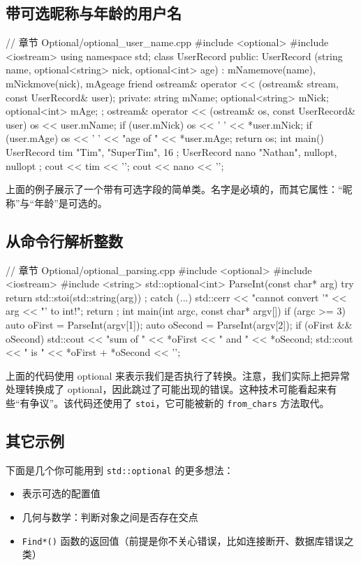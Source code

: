 \subsection{带可选昵称与年龄的用户名}
\begin{codebox}[cpp]
// 章节 Optional/optional_user_name.cpp
#include <optional>
#include <iostream>
using namespace std;
class UserRecord
{
public:
UserRecord (string name, optional<string> nick, optional<int> age)
: mName{move(name)}, mNick{move(nick)}, mAge{age}
{
}
friend ostream& operator << (ostream& stream, const UserRecord& user);
private:
string mName;
optional<string> mNick;
optional<int> mAge;
};
ostream& operator << (ostream& os, const UserRecord& user)
{
os << user.mName;
if (user.mNick)
os << ' ' << *user.mNick;
if (user.mAge)
os << ' ' << "age of " << *user.mAge;
return os;
}
int main()
{
UserRecord tim { "Tim", "SuperTim", 16 };
UserRecord nano { "Nathan", nullopt, nullopt };
cout << tim << '\n';
cout << nano << '\n';
}
\end{codebox}

上面的例子展示了一个带有可选字段的简单类。名字是必填的，而其它属性：“昵称”与“年龄”是可选的。

\subsection{从命令行解析整数}
\begin{codebox}[cpp]
// 章节 Optional/optional_parsing.cpp
#include <optional>
#include <iostream>
#include <string>
std::optional<int> ParseInt(const char* arg)
{
try
{
return { std::stoi(std::string(arg)) };
}
catch (...)
{
std::cerr << "cannot convert '" << arg << "' to int!\n";
}
return { };
}
int main(int argc, const char* argv[])
{
if (argc >= 3)
{
auto oFirst = ParseInt(argv[1]);
auto oSecond = ParseInt(argv[2]);
if (oFirst && oSecond)
{
std::cout << "sum of " << *oFirst << " and " << *oSecond;
std::cout << " is " << *oFirst + *oSecond << '\n';
}
}
}
\end{codebox}

上面的代码使用 optional 来表示我们是否执行了转换。注意，我们实际上把异常处理转换成了 optional，因此跳过了可能出现的错误。这种技术可能看起来有些“有争议”。该代码还使用了 \texttt{stoi}，它可能被新的 \texttt{from\_chars} 方法取代。

\subsection{其它示例}
下面是几个你可能用到 \texttt{std::optional} 的更多想法：
\begin{itemize}
\item 表示可选的配置值
\item 几何与数学：判断对象之间是否存在交点
\item \texttt{Find*()} 函数的返回值（前提是你不关心错误，比如连接断开、数据库错误之类）
\end{itemize}

